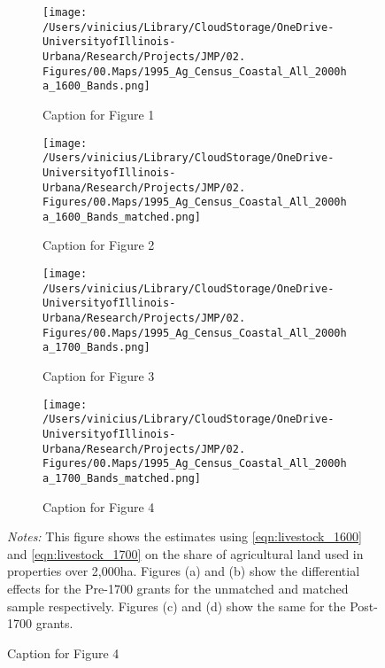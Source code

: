 \documentclass[11pt]{article}
\begin{document}
\clearpage 


\begin{landscape}
  \begin{figure}[htbp]
    \centering
    \caption{Effects of Coastal Ban with Varying Cutoffs on Agricultural Land on Properties over 2,000ha}
    \begin{subfigure}[b]{0.65\textwidth}
        \centering
        \texttt{[image: /Users/vinicius/Library/CloudStorage/OneDrive-UniversityofIllinois-Urbana/Research/Projects/JMP/02. Figures/00.Maps/1995\_Ag\_Census\_Coastal\_All\_2000ha\_1600\_Bands.png]}
        \caption{Caption for Figure 1}
        \label{fig:fig1}
    \end{subfigure}
    \hfill
    \begin{subfigure}[b]{0.65\textwidth}
        \centering
        \texttt{[image: /Users/vinicius/Library/CloudStorage/OneDrive-UniversityofIllinois-Urbana/Research/Projects/JMP/02. Figures/00.Maps/1995\_Ag\_Census\_Coastal\_All\_2000ha\_1600\_Bands\_matched.png]}
        \caption{Caption for Figure 2}
        \label{fig:fig2}
    \end{subfigure}

    \vspace{0.1cm} %

    \begin{subfigure}[b]{0.65\textwidth}
        \centering
        \texttt{[image: /Users/vinicius/Library/CloudStorage/OneDrive-UniversityofIllinois-Urbana/Research/Projects/JMP/02. Figures/00.Maps/1995\_Ag\_Census\_Coastal\_All\_2000ha\_1700\_Bands.png]}
        \caption{Caption for Figure 3}
        \label{fig:fig3}
    \end{subfigure}
    \hfill
    \begin{subfigure}[b]{0.65\textwidth}
        \centering
        \texttt{[image: /Users/vinicius/Library/CloudStorage/OneDrive-UniversityofIllinois-Urbana/Research/Projects/JMP/02. Figures/00.Maps/1995\_Ag\_Census\_Coastal\_All\_2000ha\_1700\_Bands\_matched.png]}
        \caption{Caption for Figure 4}
        \label{fig:fig4}
    \end{subfigure}

    \vspace{0.5cm}
    \justifying
    \noindent \textit{Notes:} This figure shows the estimates using \autoref{eqn:livestock_1600} and \autoref{eqn:livestock_1700} on the share of agricultural land used in properties over 2,000ha. Figures (a) and (b) show the differential effects for the Pre-1700 grants for the unmatched and matched sample respectively. Figures (c) and (d) show the same for the Post-1700 grants.
    \label{fig:robustness_all_landsize_distance_cutoff}
    
\end{figure}
\end{landscape}
\end{document}
